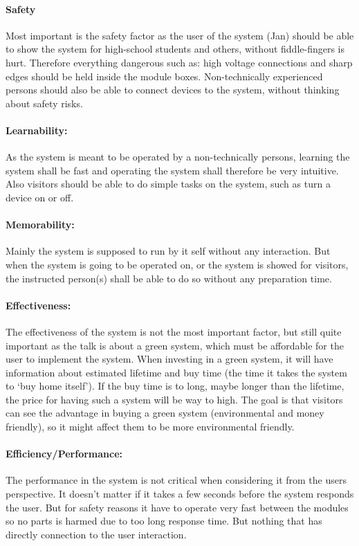 \paragraph{Safety}
Most important is the safety factor as the user of the system (Jan) should be able to show the system for high-school students and others, without fiddle-fingers is hurt. Therefore everything dangerous such as: high voltage connections and sharp edges should be held inside the module boxes.
Non-technically experienced persons should also be able to connect devices to the system, without thinking about safety risks. 
\paragraph{Learnability:}
As the system is meant to be operated by a non-technically persons, learning the system shall be fast and operating the system shall therefore be very intuitive. 
Also visitors should be able to do simple tasks on the system, such as turn a device on or off.
\paragraph{Memorability:}
Mainly the system is supposed to run by it self without any interaction. But when the system is going to be operated on, or the system is showed for visitors, the instructed person(s) shall be able to do so without any preparation time.
\paragraph{Effectiveness:}
The effectiveness of the system is not the most important factor, but still quite important as the talk is about a green system, which must be
affordable for the user to implement the system. When investing in a green system, it will have information about estimated lifetime and buy time (the time it takes the system to `buy home itself'). If the buy time is to long, maybe longer than the lifetime, the price for having such a system will be way to high. The goal is that visitors can see the advantage in buying a green system (environmental and money friendly), so it might affect them to be more environmental friendly. 
\paragraph{Efficiency/Performance:}
The performance in the system is not critical when considering it from the users perspective. It doesn't matter if it takes a few seconds before the system responds the user. But for safety reasons it have to operate very fast between the modules so no parts is harmed due to too long response time. But nothing that has directly connection to the user interaction.
